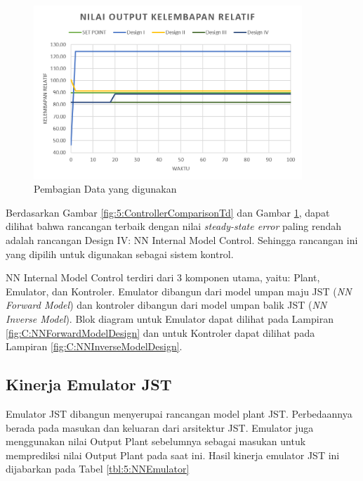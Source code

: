 \begin{figure}[!h]
	\centering
	\includegraphics[width=0.9\textwidth]{figures/ControlSystemComparisonRH}
	\caption{Pembagian Data yang digunakan}
	\label{fig:5:ControllerComparisonRH}
\end{figure}
\vspace{1em}

Berdasarkan Gambar \ref{fig:5:ControllerComparisonTd} dan Gambar \ref{fig:5:ControllerComparisonRH}, dapat dilihat bahwa rancangan terbaik dengan nilai \textit{steady-state error} paling rendah adalah rancangan Design IV: NN Internal Model Control. Sehingga rancangan ini yang dipilih untuk digunakan sebagai sistem kontrol. 

NN Internal Model Control terdiri dari 3 komponen utama, yaitu: Plant, Emulator, dan Kontroler. Emulator dibangun dari model umpan maju JST (\textit{NN Forward Model}) dan kontroler dibangun dari model umpan balik JST (\textit{NN Inverse Model}). Blok diagram untuk Emulator dapat dilihat pada Lampiran \ref{fig:C:NNForwardModelDesign} dan untuk Kontroler dapat dilihat pada Lampiran \ref{fig:C:NNInverseModelDesign}.

\subsection{Kinerja Emulator JST}

Emulator JST dibangun menyerupai rancangan model plant JST. Perbedaannya berada pada masukan dan keluaran dari arsitektur JST. Emulator juga menggunakan nilai Output Plant sebelumnya sebagai masukan untuk memprediksi nilai Output Plant pada saat ini. Hasil kinerja emulator JST ini dijabarkan pada Tabel \ref{tbl:5:NNEmulator}

